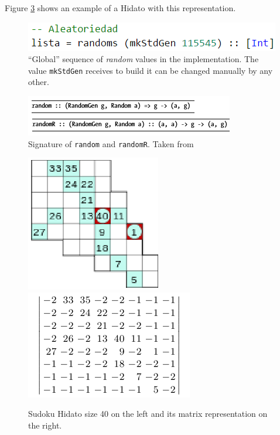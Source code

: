 \documentclass{llncs}
\begin{document}
Figure \ref{hidato} shows an example of a Hidato with this representation.

\begin{figure}
\begin{center}
\includegraphics[width= .8\columnwidth]{figuras/lista}
\end{center}
\caption{
	``Global'' sequence of \emph{random} values in the implementation. The value \texttt{mkStdGen} receives to build it can be changed manually by any other.}
\label{listar}
\end{figure}

\begin{figure}
\begin{center}
\includegraphics[width= .7\columnwidth]{figuras/rand}
\end{center}
\caption{Signature of \texttt{random} and \texttt{randomR}. Taken from \cite[p.191, p.194]{baeza}}
\label{rand}
\end{figure}

\begin{figure}
\begin{center}
\includegraphics[width= 0.3\columnwidth]{figuras/sudoku}
\includegraphics[width= 0.48\columnwidth]{figuras/matrep}
\end{center}
\caption{Sudoku Hidato size 40 on the left and its matrix representation on the right.}
\label{hidato}
\end{figure}
\end{document}
